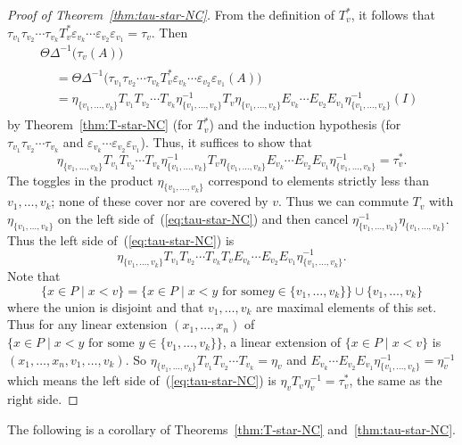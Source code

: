 \documentclass[ALCO,ThmDefs,Unicode,epreuves]{cedram}
\newcommand{\e}{\varepsilon}
\newcommand{\up}{\Delta}
\begin{document}
\begin{proof}[Proof of Theorem~\ref{thm:tau-star-NC}]
From the definition of $T_v^*$, it follows that $\tau_{v_1}\tau_{v_2}\cdots \tau_{v_k} T_v^* \e_{v_k}\cdots\e_{v_2} \e_{v_1} 
=\tau_v$.
Then
\begin{multline*}
 \Theta\up^{-1}\big(\tau_v(A)\big)\\
\begin{aligned}
 &= 
\Theta\up^{-1}\big(\tau_{v_1}\tau_{v_2}\cdots \tau_{v_k} T_v^* \e_{v_k}\cdots\e_{v_2} \e_{v_1} (A)\big)\\
&=
\eta_{\{v_1,\dots,v_k\}} T_{v_1}T_{v_2}\cdots T_{v_k} \eta_{\{v_1,\dots,v_k\}}^{-1} T_v \eta_{\{v_1,\dots,v_k\}} E_{v_k}\cdots E_{v_2}E_{v_1} \eta_{\{v_1,\dots,v_k\}}^{-1}(I)
\end{aligned}
\end{multline*}
by Theorem~\ref{thm:T-star-NC} (for $T_v^*$) and the induction hypothesis (for $\tau_{v_1}\tau_{v_2}\cdots \tau_{v_k}$ and
$\e_{v_k}\cdots\e_{v_2} \e_{v_1}$). Thus, it suffices to show that
\begin{equation}\label{eq:tau-star-NC}
\eta_{\{v_1,\dots,v_k\}} T_{v_1}T_{v_2}\cdots T_{v_k} \eta_{\{v_1,\dots,v_k\}}^{-1} T_v \eta_{\{v_1,\dots,v_k\}} E_{v_k}\cdots E_{v_2}E_{v_1} \eta_{\{v_1,\dots,v_k\}}^{-1}=\tau_v^*.
\end{equation}
The toggles in the product $\eta_{\{v_1,\dots,v_k\}}$ correspond to elements strictly less than $v_1,\dots,v_k$; none of these cover nor are covered by $v$. Thus
we can commute $T_v$ with $\eta_{\{v_1,\dots,v_k\}}$ on the left side of~(\ref{eq:tau-star-NC}) and then cancel $\eta_{\{v_1,\dots,v_k\}}^{-1} \eta_{\{v_1,\dots,v_k\}}$.
Thus the left side of~(\ref{eq:tau-star-NC}) is
\[
\eta_{\{v_1,\dots,v_k\}} T_{v_1}T_{v_2}\cdots T_{v_k} T_v E_{v_k} \cdots E_{v_2}E_{v_1} \eta_{\{v_1,\dots,v_k\}}^{-1}.
\]
Note that 
\[
\{x\in P \;|\; x<v\}=\{x\in P \;|\; x<y \text{ for some
}y\in\{v_1,\dots,v_k\}\}\cup \{v_1,\dots,v_k\}
\] 
where the union is disjoint and that
$v_1,\dots,v_k$ are maximal elements of this set. Thus for any linear extension
$(x_1,\dots,x_n)$ of $\big\{x\in P \;|\; x<y \text{ for some }y\in\{v_1,\dots,v_k\}\big\}$, a linear extension of 
$\{x\in P \;|\; x<v\}$ is
$(x_1,\dots,x_n,v_1,\dots,v_k)$.
So
$\eta_{\{v_1,\dots,v_k\}} T_{v_1}T_{v_2}\cdots T_{v_k}
=\eta_v$
and
$E_{v_k}\cdots E_{v_2}E_{v_1}\eta_{\{v_1,\dots,v_k\}}^{-1}
=\eta_v^{-1}$
which means the left side of~(\ref{eq:tau-star-NC}) is $\eta_v T_v \eta_v^{-1}= \tau_v^*$,
the same as the right side.
\end{proof}

The following is a corollary of Theorems~\ref{thm:T-star-NC} and~\ref{thm:tau-star-NC}.
\end{document}
